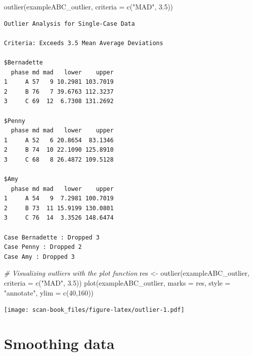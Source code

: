 \documentclass[
]{book}
\newenvironment{Shaded}{\begin{snugshade}}{\end{snugshade}}
\newcommand{\AttributeTok}[1]{\textcolor[rgb]{0.77,0.63,0.00}{#1}}
\newcommand{\CommentTok}[1]{\textcolor[rgb]{0.56,0.35,0.01}{\textit{#1}}}
\newcommand{\DecValTok}[1]{\textcolor[rgb]{0.00,0.00,0.81}{#1}}
\newcommand{\FloatTok}[1]{\textcolor[rgb]{0.00,0.00,0.81}{#1}}
\newcommand{\FunctionTok}[1]{\textcolor[rgb]{0.00,0.00,0.00}{#1}}
\newcommand{\NormalTok}[1]{#1}
\newcommand{\OtherTok}[1]{\textcolor[rgb]{0.56,0.35,0.01}{#1}}
\newcommand{\StringTok}[1]{\textcolor[rgb]{0.31,0.60,0.02}{#1}}
\begin{document}
\begin{Shaded}
\begin{Highlighting}[]
\FunctionTok{outlier}\NormalTok{(exampleABC\_outlier, }\AttributeTok{criteria =} \FunctionTok{c}\NormalTok{(}\StringTok{"MAD"}\NormalTok{, }\FloatTok{3.5}\NormalTok{))}
\end{Highlighting}
\end{Shaded}

\begin{verbatim}
Outlier Analysis for Single-Case Data

Criteria: Exceeds 3.5 Mean Average Deviations

$Bernadette
  phase md mad   lower    upper
1     A 57   9 10.2981 103.7019
2     B 76   7 39.6763 112.3237
3     C 69  12  6.7308 131.2692

$Penny
  phase md mad   lower    upper
1     A 52   6 20.8654  83.1346
2     B 74  10 22.1090 125.8910
3     C 68   8 26.4872 109.5128

$Amy
  phase md mad   lower    upper
1     A 54   9  7.2981 100.7019
2     B 73  11 15.9199 130.0801
3     C 76  14  3.3526 148.6474

Case Bernadette : Dropped 3 
Case Penny : Dropped 2 
Case Amy : Dropped 3 
\end{verbatim}

\begin{Shaded}
\begin{Highlighting}[]
\CommentTok{\# Visualizing outliers with the plot function}
\NormalTok{res }\OtherTok{\textless{}{-}} \FunctionTok{outlier}\NormalTok{(exampleABC\_outlier, }\AttributeTok{criteria =} \FunctionTok{c}\NormalTok{(}\StringTok{"MAD"}\NormalTok{, }\FloatTok{3.5}\NormalTok{))}
\FunctionTok{plot}\NormalTok{(exampleABC\_outlier, }\AttributeTok{marks =}\NormalTok{ res, }\AttributeTok{style =} \StringTok{"annotate"}\NormalTok{, }\AttributeTok{ylim =} \FunctionTok{c}\NormalTok{(}\DecValTok{40}\NormalTok{,}\DecValTok{160}\NormalTok{))}
\end{Highlighting}
\end{Shaded}

\texttt{[image: scan-book\_files/figure-latex/outlier-1.pdf]}

\hypertarget{smoothing-data}{%
\section{Smoothing data}\label{smoothing-data}}
\end{document}
